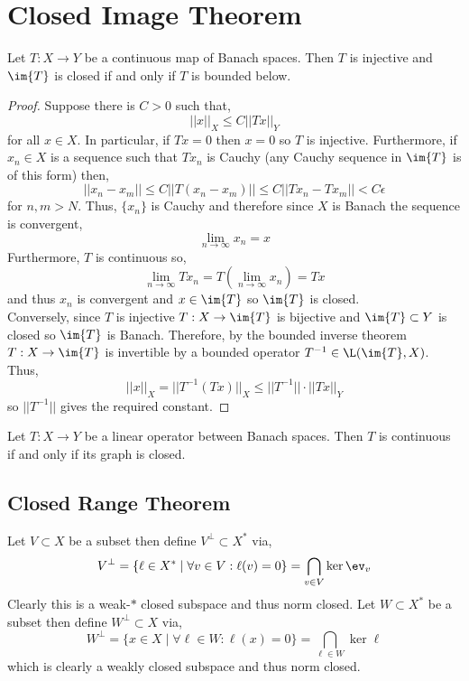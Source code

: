 \documentclass[12pt]{article}
\begin{document}
\section{Closed Image Theorem}

\begin{lemma}
Let $T : X \to Y$ be a continuous map of Banach spaces. Then $T$ is injective and $\im{T}$ is closed if and only if $T$ is bounded below.
\end{lemma}

\begin{proof}
Suppose there is $C > 0$ such that,
\[ || x ||_X \le C || T x ||_Y \]
for all $x \in X$. In particular, if $T x = 0$ then $x = 0$ so $T$ is injective. Furthermore, if $x_n \in X$ is a sequence such that $T x_n$ is Cauchy (any Cauchy sequence in $\im{T}$ is of this form) then,
\[ || x_n - x_m || \le C || T (x_n - x_m) || \le C || T x_n - T x_m || < C \epsilon \]
for $n, m > N$. Thus, $\{ x_n \}$ is Cauchy and therefore since $X$ is Banach the sequence is convergent,
\[ \lim_{n \to \infty} x_n = x \]
Furthermore, $T$ is continuous so,
\[ \lim_{n \to \infty} T x_n = T (\lim_{n \to \infty} x_n) = T x \]
and thus $x_n$ is convergent and $x \in \im{T}$ so $\im{T}$ is closed.
\bigskip\\
Conversely, since $T$ is injective $T : X \to \im{T}$ is bijective and $\im{T} \subset Y$ is closed so $\im{T}$ is Banach. Therefore, by the bounded inverse theorem $T : X \to \im{T}$ is invertible by a bounded operator $T^{-1} \in \L(\im{T}, X)$. Thus,
\[ || x ||_{X} = || T^{-1}(T x) ||_{X} \le || T^{-1} || \cdot || T x ||_{Y} \]
so $|| T^{-1} ||$ gives the required constant.
\end{proof}

\begin{thm}
Let $T : X \to Y$ be a linear operator between Banach spaces. Then $T$ is continuous if and only if its graph is closed.
\end{thm}

\subsection{Closed Range Theorem}

\begin{defn}
Let $V \subset X$ be a subset then define $V^\perp \subset X^*$ via,
\[ V^\perp = \{ \ell \in X^* \mid \forall v \in V : \ell(v) = 0 \} = \bigcap_{v \in V} \ker{\ev_v} \]
Clearly this is a weak-$*$ closed subspace and thus norm closed. Let $W \subset X^*$ be a subset then define $W^\perp \subset X$ via,
\[ W^\perp = \{ x \in X \mid \forall \ell \in W : \ell(x) = 0 \} = \bigcap_{\ell \in W} \ker{\ell} \]
which is clearly a weakly closed subspace and thus norm closed.
\end{defn}
\end{document}
